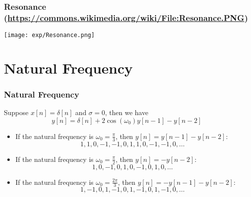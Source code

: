 \documentclass{beamer}
\begin{document}
\begin{frame}
  \frametitle{Resonance {\tiny(\url{https://commons.wikimedia.org/wiki/File:Resonance.PNG})}}

  \centerline{\texttt{[image: exp/Resonance.png]}}

\end{frame}

\section[Natural Frequency]{Natural Frequency}
\setcounter{subsection}{1}

\begin{frame}
  \frametitle{Natural Frequency}

  Suppose $x[n]=\delta[n]$ and $\sigma=0$, then we have
  \begin{displaymath}
    y[n] = \delta[n]+2\cos(\omega_0)y[n-1] - y[n-2]
  \end{displaymath}
  \begin{itemize}
  \item If the natural frequency is $\omega_0 = \frac{\pi}{3}$, then
    $y[n]=y[n-1]-y[n-2]$:
    \begin{displaymath}
      1,1,0,-1,-1,0,1,1,0,-1,-1,0,\ldots
    \end{displaymath}
  \item If the natural frequency is $\omega_0=\frac{\pi}{2}$, then
    $y[n]=-y[n-2]$:
    \begin{displaymath}
      1,0,-1,0,1,0,-1,0,1,0,\ldots
    \end{displaymath}
  \item If the natural frequency is $\omega_0 = \frac{2\pi}{3}$, then
    $y[n]=-y[n-1]-y[n-2]$:
    \begin{displaymath}
      1,-1,0,1,-1,0,1,-1,0,1,-1,0,\ldots
    \end{displaymath}
  \end{itemize}
\end{frame}
\end{document}

